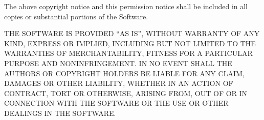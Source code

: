 \documentclass[letterpaper,10pt,english]{sphinxmanual}
\begin{document}
The above copyright notice and this permission notice shall be included in all copies or substantial portions of the Software.

THE SOFTWARE IS PROVIDED ``AS IS'', WITHOUT WARRANTY OF ANY KIND, EXPRESS OR IMPLIED, INCLUDING BUT NOT LIMITED TO THE
WARRANTIES OF MERCHANTABILITY, FITNESS FOR A PARTICULAR PURPOSE AND NONINFRINGEMENT. IN NO EVENT SHALL THE AUTHORS OR
COPYRIGHT HOLDERS BE LIABLE FOR ANY CLAIM, DAMAGES OR OTHER LIABILITY, WHETHER IN AN ACTION OF CONTRACT, TORT OR OTHERWISE,
ARISING FROM, OUT OF OR IN CONNECTION WITH THE SOFTWARE OR THE USE OR OTHER DEALINGS IN THE SOFTWARE.



\renewcommand{\indexname}{Index}
\printindex
\end{document}

